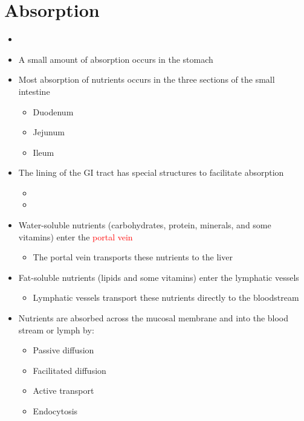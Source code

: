 \documentclass[title={Chapter 3}]{fdsn201notes}
\begin{document}
\section{Absorption}\label{sec:absorption}
\begin{itemize}
	\item {}
	\item A small amount of absorption occurs in the stomach
	\item Most absorption of nutrients occurs in the three sections of the small intestine
	\begin{itemize}
		\item Duodenum
		\item Jejunum
		\item Ileum
	\end{itemize}
	\item The lining of the GI tract has special structures to facilitate absorption
	\begin{itemize}
		\item {}
		\item {}
	\end{itemize}
\end{itemize}

\begin{itemize}
	\item Water-soluble nutrients (carbohydrates, protein, minerals, and some vitamins) enter the \textcolor{red}{portal vein}
	\begin{itemize}
		\item The portal vein transports these nutrients to the liver
	\end{itemize}
	\item Fat-soluble nutrients (lipids and some vitamins) enter the lymphatic vessels
	\begin{itemize}
		\item Lymphatic vessels transport these nutrients directly to the bloodstream
	\end{itemize}
\end{itemize}

\begin{itemize}
	\item Nutrients are absorbed across the mucosal membrane and into the blood stream or lymph by:
	\begin{itemize}
		\item Passive diffusion
		\item Facilitated diffusion
		\item Active transport
		\item Endocytosis
	\end{itemize}
\end{itemize}
\end{document}
